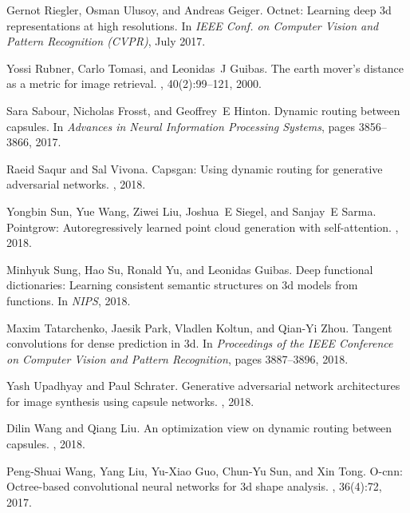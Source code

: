 \documentclass[10pt,twocolumn,letterpaper]{article}
\theoremstyle{break}
\begin{document}
{\begin{thebibliography}{10}
Gernot Riegler, Osman Ulusoy, and Andreas Geiger.
\newblock Octnet: Learning deep 3d representations at high resolutions.
\newblock In {\em IEEE Conf. on Computer Vision and Pattern Recognition
  (CVPR)}, July 2017.

Yossi Rubner, Carlo Tomasi, and Leonidas~J Guibas.
\newblock The earth mover's distance as a metric for image retrieval.
, 40(2):99--121, 2000.

Sara Sabour, Nicholas Frosst, and Geoffrey~E Hinton.
\newblock Dynamic routing between capsules.
\newblock In {\em Advances in Neural Information Processing Systems}, pages
  3856--3866, 2017.

Raeid Saqur and Sal Vivona.
\newblock Capsgan: Using dynamic routing for generative adversarial networks.
, 2018.

Yongbin Sun, Yue Wang, Ziwei Liu, Joshua~E Siegel, and Sanjay~E Sarma.
\newblock Pointgrow: Autoregressively learned point cloud generation with
  self-attention.
, 2018.

Minhyuk Sung, Hao Su, Ronald Yu, and Leonidas Guibas.
\newblock Deep functional dictionaries: Learning consistent semantic structures
  on 3d models from functions.
\newblock In {\em NIPS}, 2018.

Maxim Tatarchenko, Jaesik Park, Vladlen Koltun, and Qian-Yi Zhou.
\newblock Tangent convolutions for dense prediction in 3d.
\newblock In {\em Proceedings of the IEEE Conference on Computer Vision and
  Pattern Recognition}, pages 3887--3896, 2018.

Yash Upadhyay and Paul Schrater.
\newblock Generative adversarial network architectures for image synthesis
  using capsule networks.
, 2018.

Dilin Wang and Qiang Liu.
\newblock An optimization view on dynamic routing between capsules.
, 2018.

Peng-Shuai Wang, Yang Liu, Yu-Xiao Guo, Chun-Yu Sun, and Xin Tong.
\newblock O-cnn: Octree-based convolutional neural networks for 3d shape
  analysis.
, 36(4):72, 2017.


\end{thebibliography}}
\end{document}
